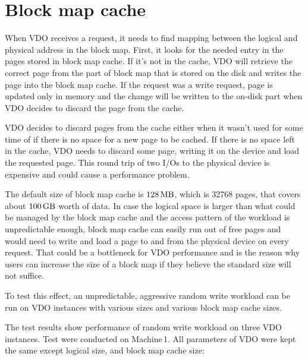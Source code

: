 \documentclass[
  color, %
  table, %
  lof,   %
  lot,   %
]{fithesis3}
\begin{document}
\section{Block map cache}

When VDO receives a request, it needs to find mapping between the logical and physical address in the block map. First, it looks for the needed entry in the pages stored in block map cache. If it's not in the cache, VDO will retrieve the correct page from the part of block map that is stored on the disk and writes the page into the block map cache. If the request was a write request, page is updated only in memory and the change will be written to the on-disk part when VDO decides to discard the page from the cache.

VDO decides to discard pages from the cache either when it wasn't used for some time of if there is no space for a new page to be cached. If there is no space left in the cache, VDO needs to discard some page, writing it on the device and load the requested page. This round trip of two I/Os to the physical device is expensive and could cause a performance problem.

The default size of block map cache is $\SI{128}{\mega\byte}$, which is 32768 pages, that covers about $\SI{100}{\giga\byte}$ worth of data. In case the logical space is larger than what could be managed by the block map cache and the access pattern of the workload is unpredictable enough, block map cache can easily run out of free pages and would need to write and load a page to and from the physical device on every request. That could be a bottleneck for VDO performance and is the reason why users can increase the size of a block map if they believe the standard size will not suffice.

To test this effect, an unpredictable, aggressive random write workload can be run on VDO instances with various sizes and various block map cache sizes.

The test results show performance of random write workload on three VDO instances. Test were conducted on Machine\,1. All parameters of VDO were kept the same except logical size, and block map cache size:
\end{document}
